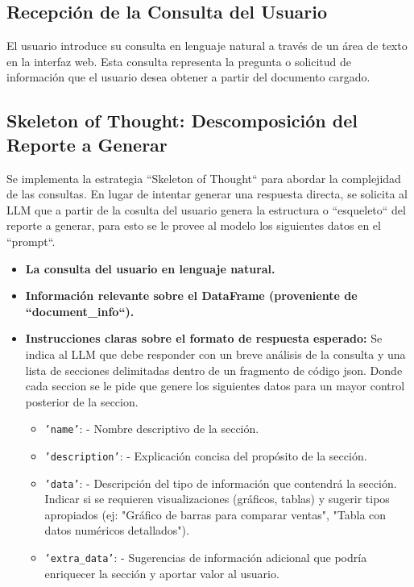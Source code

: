 \subsection{Recepción de la Consulta del Usuario}

El usuario introduce su consulta en lenguaje natural a través de un área de texto en la interfaz web. Esta consulta representa la pregunta o solicitud de información que el usuario desea obtener a partir del documento cargado.

\subsection{Skeleton of Thought: Descomposición del Reporte a Generar}

Se implementa la estrategia ``Skeleton of Thought`` para abordar la complejidad de las consultas.  En lugar de intentar generar una respuesta directa,  se solicita al LLM que a partir de la cosulta del usuario genera la estructura o ``esqueleto`` del reporte a generar, para esto se le provee al modelo los siguientes datos en el ``prompt``.

\begin{itemize}
	\item \textbf{La consulta del usuario en lenguaje natural.}
	\item \textbf{Información relevante sobre el DataFrame (proveniente de ``document\_info``).}
	\item \textbf{Instrucciones claras sobre el formato de respuesta esperado:}  Se indica al LLM que debe responder con un breve análisis de la consulta y una lista de secciones delimitadas dentro de un fragmento de código json. Donde cada seccion se le pide que genere los siguientes datos para un mayor control posterior de la seccion. 
	\begin{itemize}
		\item \texttt{'name'}: - Nombre descriptivo de la sección.
		\item \texttt{'description'}: -  Explicación concisa del propósito de la sección.
		\item \texttt{'data'}: - Descripción del tipo de información que contendrá la sección.  Indicar si se requieren visualizaciones (gráficos, tablas) y sugerir tipos apropiados (ej: "Gráfico de barras para comparar ventas", "Tabla con datos numéricos detallados").
		\item \texttt{'extra\_data'}: -  Sugerencias de información adicional que podría enriquecer la sección y aportar valor al usuario.
	\end{itemize}
\end{itemize}

